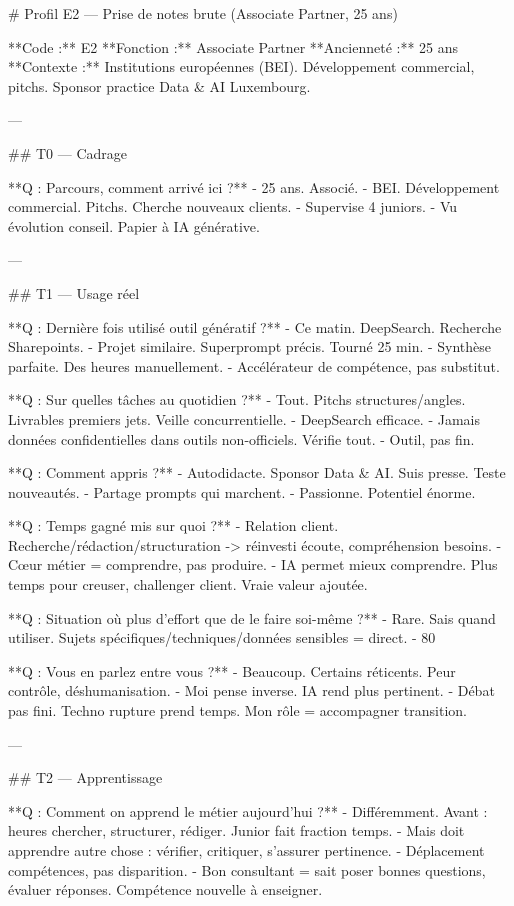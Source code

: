 # Profil E2 — Prise de notes brute (Associate Partner, 25 ans)

**Code :** E2  
**Fonction :** Associate Partner  
**Ancienneté :** 25 ans  
**Contexte :** Institutions européennes (BEI). Développement commercial, pitchs. Sponsor practice Data & AI Luxembourg.

---

## T0 — Cadrage

**Q : Parcours, comment arrivé ici ?**
- 25 ans. Associé.
- BEI. Développement commercial. Pitchs. Cherche nouveaux clients.
- Supervise 4 juniors.
- Vu évolution conseil. Papier à IA générative.

---

## T1 — Usage réel

**Q : Dernière fois utilisé outil génératif ?**
- Ce matin. DeepSearch. Recherche Sharepoints.
- Projet similaire. Superprompt précis. Tourné 25 min.
- Synthèse parfaite. Des heures manuellement.
- Accélérateur de compétence, pas substitut.

**Q : Sur quelles tâches au quotidien ?**
- Tout. Pitchs structures/angles. Livrables premiers jets. Veille concurrentielle.
- DeepSearch efficace.
- Jamais données confidentielles dans outils non-officiels. Vérifie tout.
- Outil, pas fin.

**Q : Comment appris ?**
- Autodidacte. Sponsor Data & AI. Suis presse. Teste nouveautés.
- Partage prompts qui marchent.
- Passionne. Potentiel énorme.

**Q : Temps gagné mis sur quoi ?**
- Relation client. Recherche/rédaction/structuration -> réinvesti écoute, compréhension besoins.
- Cœur métier = comprendre, pas produire.
- IA permet mieux comprendre. Plus temps pour creuser, challenger client. Vraie valeur ajoutée.

**Q : Situation où plus d'effort que de le faire soi-même ?**
- Rare. Sais quand utiliser. Sujets spécifiques/techniques/données sensibles = direct.
- 80%

**Q : Vous en parlez entre vous ?**
- Beaucoup. Certains réticents. Peur contrôle, déshumanisation.
- Moi pense inverse. IA rend plus pertinent.
- Débat pas fini. Techno rupture prend temps. Mon rôle = accompagner transition.

---

## T2 — Apprentissage

**Q : Comment on apprend le métier aujourd'hui ?**
- Différemment. Avant : heures chercher, structurer, rédiger. Junior fait fraction temps.
- Mais doit apprendre autre chose : vérifier, critiquer, s'assurer pertinence.
- Déplacement compétences, pas disparition.
- Bon consultant = sait poser bonnes questions, évaluer réponses. Compétence nouvelle à enseigner.

